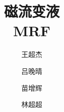 \documentclass[12pt]{article}
\begin{document}
\title{ 磁流变液\\
	MRF}
\date{}
\author{王超杰\and 吕晚晴\and 苗增辉\and 林超超}

\maketitle

\abstract

\thispagestyle{empty}
\newpage
\tableofcontents
\thispagestyle{empty}
\newpage
\setcounter{page}{1}












\end{document}
